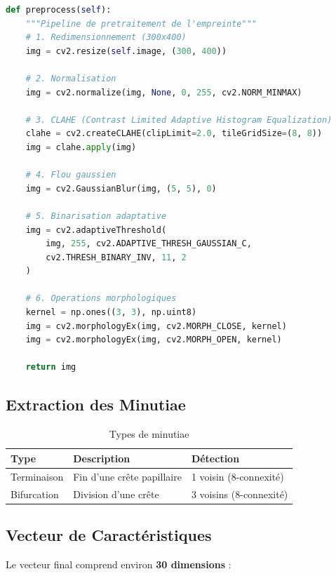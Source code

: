 \documentclass[12pt,a4paper]{report}
\begin{document}
\begin{lstlisting}[caption={Prétraitement de l'empreinte},language=Python]
def preprocess(self):
    """Pipeline de pretraitement de l'empreinte"""
    # 1. Redimensionnement (300x400)
    img = cv2.resize(self.image, (300, 400))
    
    # 2. Normalisation
    img = cv2.normalize(img, None, 0, 255, cv2.NORM_MINMAX)
    
    # 3. CLAHE (Contrast Limited Adaptive Histogram Equalization)
    clahe = cv2.createCLAHE(clipLimit=2.0, tileGridSize=(8, 8))
    img = clahe.apply(img)
    
    # 4. Flou gaussien
    img = cv2.GaussianBlur(img, (5, 5), 0)
    
    # 5. Binarisation adaptative
    img = cv2.adaptiveThreshold(
        img, 255, cv2.ADAPTIVE_THRESH_GAUSSIAN_C, 
        cv2.THRESH_BINARY_INV, 11, 2
    )
    
    # 6. Operations morphologiques
    kernel = np.ones((3, 3), np.uint8)
    img = cv2.morphologyEx(img, cv2.MORPH_CLOSE, kernel)
    img = cv2.morphologyEx(img, cv2.MORPH_OPEN, kernel)
    
    return img
\end{lstlisting}

\subsection{Extraction des Minutiae}

\begin{table}[H]
    \centering
    \caption{Types de minutiae}
    \label{tab:minutiae}
    \begin{tabular}{|l|l|l|}
        \hline
        \textbf{Type} & \textbf{Description} & \textbf{Détection} \\
        \hline
        Terminaison & Fin d'une crête papillaire & 1 voisin (8-connexité) \\
        \hline
        Bifurcation & Division d'une crête & 3 voisins (8-connexité) \\
        \hline
    \end{tabular}
\end{table}

\subsection{Vecteur de Caractéristiques}

Le vecteur final comprend environ \textbf{30 dimensions} :
\end{document}
